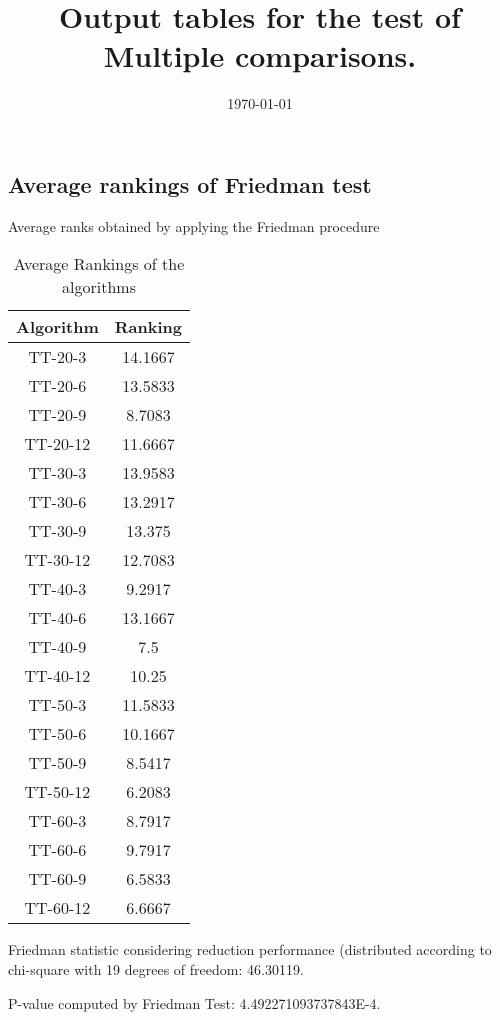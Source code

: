 \documentclass[a4paper,10pt]{article}
\title{Output tables for the test of Multiple comparisons.}
\author{}
\date{\today}
\begin{document}
\begin{landscape}
\pagestyle{empty}
\maketitle
\thispagestyle{empty}
\section{Average rankings of Friedman test}



Average ranks obtained by applying the Friedman procedure

\begin{table}[!htp]
\centering
\begin{tabular}{|c|c|}\hline
Algorithm&Ranking\\\hline
TT-20-3 & 14.1667\\
TT-20-6 & 13.5833\\
TT-20-9 & 8.7083\\
TT-20-12 & 11.6667\\
TT-30-3 & 13.9583\\
TT-30-6 & 13.2917\\
TT-30-9 & 13.375\\
TT-30-12 & 12.7083\\
TT-40-3 & 9.2917\\
TT-40-6 & 13.1667\\
TT-40-9 & 7.5\\
TT-40-12 & 10.25\\
TT-50-3 & 11.5833\\
TT-50-6 & 10.1667\\
TT-50-9 & 8.5417\\
TT-50-12 & 6.2083\\
TT-60-3 & 8.7917\\
TT-60-6 & 9.7917\\
TT-60-9 & 6.5833\\
TT-60-12 & 6.6667\\
\hline
\end{tabular}
\caption{Average Rankings of the algorithms}
\end{table}

Friedman statistic considering reduction performance (distributed according to chi-square with 19 degrees of freedom: 46.30119.

P-value computed by Friedman Test: 4.492271093737843E-4.\newline




\end{landscape}
\end{document}
